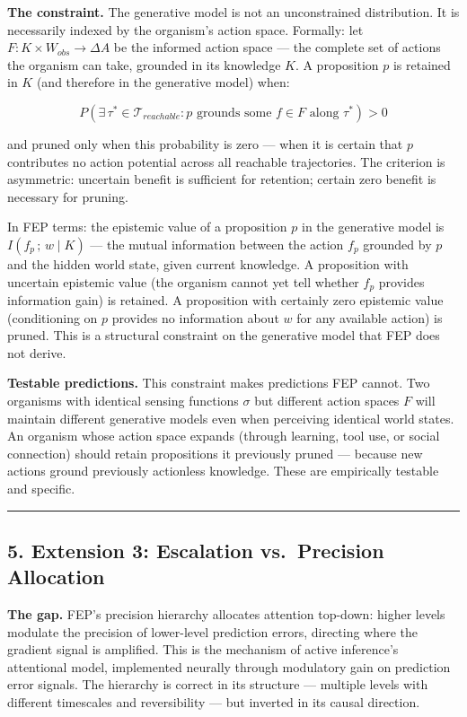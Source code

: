 \documentclass[
]{article}
\begin{document}
\textbf{The constraint.} The generative model is not an unconstrained
distribution. It is necessarily indexed by the organism's action space.
Formally: let \(F : K \times W_{obs}
\rightarrow \Delta A\) be the informed action space --- the complete set
of actions the organism can take, grounded in its knowledge \(K\). A
proposition \(p\) is retained in \(K\) (and therefore in the generative
model) when:

\[P\!\left(\exists\,\tau^* \in \mathcal{T}_{reachable} : p \text{ grounds some } f \in F \text{ along } \tau^*\right) > 0\]

and pruned only when this probability is zero --- when it is certain
that \(p\) contributes no action potential across all reachable
trajectories. The criterion is asymmetric: uncertain benefit is
sufficient for retention; certain zero benefit is necessary for pruning.

In FEP terms: the epistemic value of a proposition \(p\) in the
generative model is \(I(f_p\,;\,w \mid K)\) --- the mutual information
between the action \(f_p\) grounded by \(p\) and the hidden world state,
given current knowledge. A proposition with uncertain epistemic value
(the organism cannot yet tell whether \(f_p\) provides information gain)
is retained. A proposition with certainly zero epistemic value
(conditioning on \(p\) provides no information about \(w\) for any
available action) is pruned. This is a structural constraint on the
generative model that FEP does not derive.

\textbf{Testable predictions.} This constraint makes predictions FEP
cannot. Two organisms with identical sensing functions \(\sigma\) but
different action spaces \(F\) will maintain different generative models
even when perceiving identical world states. An organism whose action
space expands (through learning, tool use, or social connection) should
retain propositions it previously pruned --- because new actions ground
previously actionless knowledge. These are empirically testable and
specific.

\begin{center}\rule{0.5\linewidth}{0.5pt}\end{center}

\subsection{5. Extension 3: Escalation vs.~Precision
Allocation}\label{extension-3-escalation-vs.-precision-allocation}

\textbf{The gap.} FEP's precision hierarchy allocates attention
top-down: higher levels modulate the precision of lower-level prediction
errors, directing where the gradient signal is amplified. This is the
mechanism of active inference's attentional model, implemented neurally
through modulatory gain on prediction error signals. The hierarchy is
correct in its structure --- multiple levels with different timescales
and reversibility --- but inverted in its causal direction.
\end{document}

